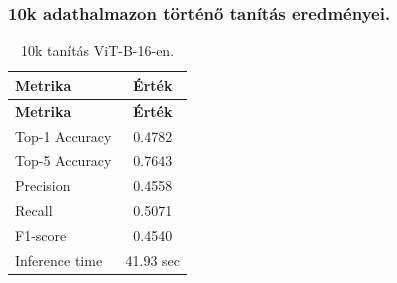 \subsubsection{10k adathalmazon történő tanítás eredményei.}
  \begin{center}
    \begin{longtable}{l c}
    \caption{10k tanítás ViT-B-16-en.} \label{tab:phase03_ViT-B-16_10k} \\
    \toprule
    \textbf{Metrika} & \textbf{Érték} \\
    \midrule
    \endfirsthead
    \toprule
    \textbf{Metrika} & \textbf{Érték} \\
    \midrule
    \endhead
    Top-1 Accuracy & 0.4782 \\
    Top-5 Accuracy & 0.7643 \\
    Precision      & 0.4558 \\
    Recall         & 0.5071 \\
    F1-score       & 0.4540 \\
    Inference time & 41.93 sec \\
    \bottomrule
    \end{longtable}
  \end{center}

